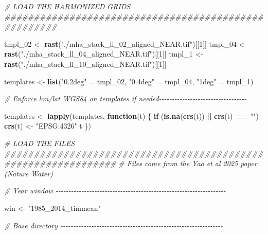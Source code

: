 \documentclass[
  11pt,
]{article}
\newenvironment{Shaded}{\begin{snugshade}}{\end{snugshade}}
\newcommand{\CommentTok}[1]{\textcolor[rgb]{0.56,0.35,0.01}{\textit{#1}}}
\newcommand{\ControlFlowTok}[1]{\textcolor[rgb]{0.13,0.29,0.53}{\textbf{#1}}}
\newcommand{\DecValTok}[1]{\textcolor[rgb]{0.00,0.00,0.81}{#1}}
\newcommand{\FunctionTok}[1]{\textcolor[rgb]{0.13,0.29,0.53}{\textbf{#1}}}
\newcommand{\NormalTok}[1]{#1}
\newcommand{\OtherTok}[1]{\textcolor[rgb]{0.56,0.35,0.01}{#1}}
\newcommand{\SpecialCharTok}[1]{\textcolor[rgb]{0.81,0.36,0.00}{\textbf{#1}}}
\newcommand{\StringTok}[1]{\textcolor[rgb]{0.31,0.60,0.02}{#1}}
\begin{document}
\begin{Shaded}
\begin{Highlighting}[]
\CommentTok{\# LOAD THE HARMONIZED GRIDS \#\#\#\#\#\#\#\#\#\#\#\#\#\#\#\#\#\#\#\#\#\#\#\#\#\#\#\#\#\#\#\#\#\#\#\#\#\#\#\#\#\#\#\#\#\#\#\#\#\#\#\#\#}

\NormalTok{tmpl\_02 }\OtherTok{\textless{}{-}} \FunctionTok{rast}\NormalTok{(}\StringTok{"./mha\_stack\_ll\_02\_aligned\_NEAR.tif"}\NormalTok{)[[}\DecValTok{1}\NormalTok{]]}
\NormalTok{tmpl\_04 }\OtherTok{\textless{}{-}} \FunctionTok{rast}\NormalTok{(}\StringTok{"./mha\_stack\_ll\_04\_aligned\_NEAR.tif"}\NormalTok{)[[}\DecValTok{1}\NormalTok{]]}
\NormalTok{tmpl\_1 }\OtherTok{\textless{}{-}} \FunctionTok{rast}\NormalTok{(}\StringTok{"./mha\_stack\_ll\_10\_aligned\_NEAR.tif"}\NormalTok{)[[}\DecValTok{1}\NormalTok{]]}

\NormalTok{templates }\OtherTok{\textless{}{-}} \FunctionTok{list}\NormalTok{(}\StringTok{"0.2deg"} \OtherTok{=}\NormalTok{ tmpl\_02, }\StringTok{"0.4deg"} \OtherTok{=}\NormalTok{ tmpl\_04, }\StringTok{"1deg"} \OtherTok{=}\NormalTok{ tmpl\_1)}

\CommentTok{\# Enforce lon/lat WGS84 on templates if needed{-}{-}{-}{-}{-}{-}{-}{-}{-}{-}{-}{-}{-}{-}{-}{-}{-}{-}{-}{-}{-}{-}{-}{-}{-}{-}{-}{-}{-}{-}{-}{-}{-}{-}}

\NormalTok{templates }\OtherTok{\textless{}{-}} \FunctionTok{lapply}\NormalTok{(templates, }\ControlFlowTok{function}\NormalTok{(t) \{}
  \ControlFlowTok{if}\NormalTok{ (}\FunctionTok{is.na}\NormalTok{(}\FunctionTok{crs}\NormalTok{(t)) }\SpecialCharTok{||} \FunctionTok{crs}\NormalTok{(t) }\SpecialCharTok{==} \StringTok{""}\NormalTok{) }\FunctionTok{crs}\NormalTok{(t) }\OtherTok{\textless{}{-}} \StringTok{"EPSG:4326"}
\NormalTok{  t}
\NormalTok{\})}

\CommentTok{\# LOAD THE FILES \#\#\#\#\#\#\#\#\#\#\#\#\#\#\#\#\#\#\#\#\#\#\#\#\#\#\#\#\#\#\#\#\#\#\#\#\#\#\#\#\#\#\#\#\#\#\#\#\#\#\#\#\#\#\#\#\#\#\#\#\#\#\#}
\CommentTok{\# Files come from the Yao et al 2025 paper (Nature Water)}

\CommentTok{\# Year window {-}{-}{-}{-}{-}{-}{-}{-}{-}{-}{-}{-}{-}{-}{-}{-}{-}{-}{-}{-}{-}{-}{-}{-}{-}{-}{-}{-}{-}{-}{-}{-}{-}{-}{-}{-}{-}{-}{-}{-}{-}{-}{-}{-}{-}{-}{-}{-}{-}{-}{-}{-}{-}{-}{-}{-}{-}{-}{-}{-}{-}{-}{-}{-}{-}{-}}

\NormalTok{win }\OtherTok{\textless{}{-}} \StringTok{"1985\_2014\_timmean"}

\CommentTok{\# Base directory {-}{-}{-}{-}{-}{-}{-}{-}{-}{-}{-}{-}{-}{-}{-}{-}{-}{-}{-}{-}{-}{-}{-}{-}{-}{-}{-}{-}{-}{-}{-}{-}{-}{-}{-}{-}{-}{-}{-}{-}{-}{-}{-}{-}{-}{-}{-}{-}{-}{-}{-}{-}{-}{-}{-}{-}{-}{-}{-}{-}{-}{-}{-}}


\end{Highlighting}
\end{Shaded}
\end{document}
